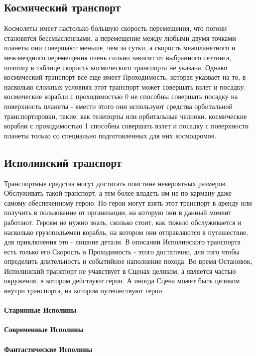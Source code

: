 \subsection{Космический транспорт}
Космолеты имеет настолько большую скорость перемещения, что погони становятся бессмысленными, а перемещение между любыми двумя точками планеты они совершают меньше, чем за сутки, а скорость межпланетного и межзвездного перемещения очень сильно зависит от выбранного сеттинга, поэтому в таблице скорость космического транспорта не указана. Однако космический транспорт все еще имеет Проходимость, которая указвает на то, в насколько сложных условиях этот транспорт может совершать взлет и посадку.
\newline космические корабли с проходимостью 0 не способны совершать посадку на поверхность планеты - вместо этого они используют средства орбитальной транспортировки, такие, как телепорты или орбитальные челноки.
\newline космические корабли с проходимостью 1 способны совершать взлет и посадку с поверхности планеты только со специально подготовленных для них космодромов.
\tbd
{}

\subsection{Исполинский транспорт}
Транспортные средства могут достигать поистине невероятных размеров. Обслуживать такой транспорт, а тем более владеть им не по карману даже самому обеспеченному герою. Но герои могут взять этот транспорт в аренду или получить в пользование от организации, на которую они в данный момент работают.
\newline Героям не нужно знать, сколько стоит, как тяжело обслуживается и насколько грузоподъемен корабль, на котором они отправляются в путешествие, для приключения это - лишние детали. В описании Исполинского транспорта есть только его Скорость и Проходимость - этого достаточно, для того чтобы определить длительность и событийное наполнение похода.
\newline Во время Остановок, Исполинский транспорт не учавствует в Сценах целиком, а является частью окружения, в котором действуют герои. А иногда Сцена может быть целиком внутри транспорта, на котором путешествуют герои.
\paragraph{Старинные Исполины}
\paragraph{Современные Исполины}
\paragraph{Фантастические Исполины}
